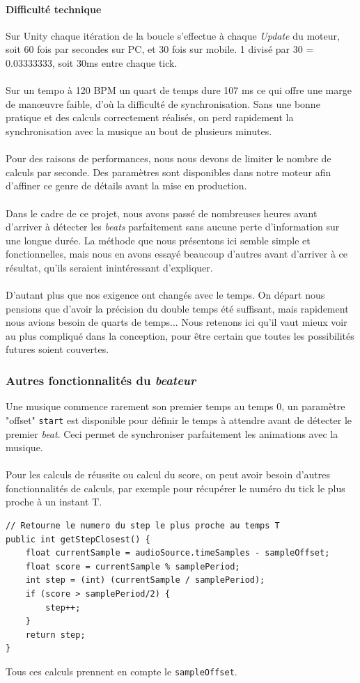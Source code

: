 \paragraph{Difficulté technique}
Sur Unity chaque itération de la boucle s'effectue à chaque \textit{Update} du moteur, soit 60 fois par secondes sur PC, et 30 fois sur mobile. 1 divisé par 30 = 0.03333333, soit 30ms entre chaque tick.\\\\
Sur un tempo à 120 BPM un quart de temps dure 107 ms ce qui offre une marge de manœuvre faible, d'où la difficulté de synchronisation. Sans une bonne pratique et des calculs correctement réalisés, on perd rapidement la synchronisation avec la musique au bout de plusieurs minutes.\\\\
Pour des raisons de performances, nous nous devons de limiter le nombre de calculs par seconde. Des paramètres sont disponibles dans notre moteur afin d'affiner ce genre de détails avant la mise en production.\\\\
Dans le cadre de ce projet, nous avons passé de nombreuses heures avant d'arriver à détecter les \textit{beats} parfaitement sans aucune perte d'information sur une longue durée. La méthode que nous présentons ici semble simple et fonctionnelles, mais nous en avons essayé beaucoup d'autres avant d'arriver à ce résultat, qu'ils seraient inintéressant d'expliquer.\\\\
D'autant plus que nos exigence ont changés avec le temps. On départ nous pensions que d'avoir la précision du double temps été suffisant, mais rapidement nous avions besoin de quarts de temps... Nous retenons ici qu'il vaut mieux voir au plus compliqué dans la conception, pour être certain que toutes les possibilités futures soient couvertes.


\subsubsection{Autres fonctionnalités du \textit{beateur}}
Une musique commence rarement son premier temps au temps 0, un paramètre "offset" \texttt{start} est disponible pour définir le temps à attendre avant de détecter le premier \textit{beat}. Ceci permet de synchroniser parfaitement les animations avec la musique.
\\\\
Pour les calculs de réussite ou calcul du score, on peut avoir besoin d'autres fonctionnalités de calculs, par exemple pour récupérer le numéro du tick le plus proche à un instant T.
\\
\begin{lstlisting}
// Retourne le numero du step le plus proche au temps T
public int getStepClosest() {
    float currentSample = audioSource.timeSamples - sampleOffset;
    float score = currentSample % samplePeriod;
    int step = (int) (currentSample / samplePeriod);
    if (score > samplePeriod/2) {
        step++;
    }
    return step;
}
\end{lstlisting}
Tous ces calculs prennent en compte le \texttt{sampleOffset}.

